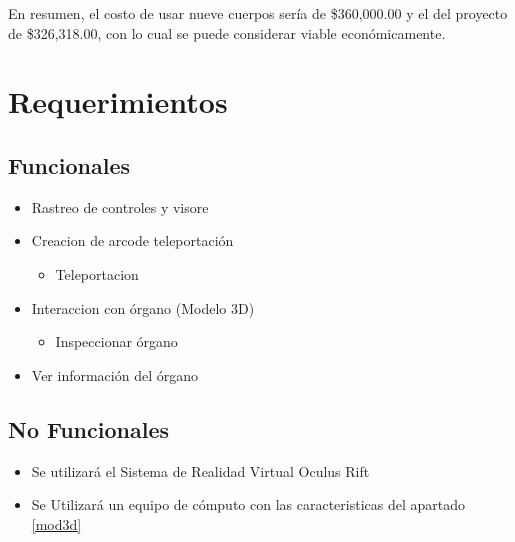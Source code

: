 En resumen, el costo de usar nueve cuerpos sería de \$360,000.00 y el del proyecto de \$326,318.00, con lo cual se puede considerar viable económicamente.\\

\section{Requerimientos}

\subsection{Funcionales}
\begin{itemize}
  \item Rastreo de controles y visore
  \item Creacion de arcode teleportación
  \begin{itemize}
    \item Teleportacion
  \end{itemize}
  \item Interaccion con órgano (Modelo 3D)
  \begin{itemize}
    \item Inspeccionar órgano
  \end{itemize}
  \item Ver información del órgano
\end{itemize}
\subsection{No Funcionales}
\begin{itemize}
  \item Se utilizará el Sistema de Realidad Virtual Oculus Rift 
  \item Se Utilizará un equipo de cómputo con las caracteristicas del apartado \ref{mod3d} 
\end{itemize}

